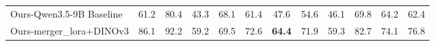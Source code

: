 \begin{table}[t]
{\begin{tabular}{lccccccccccc}
	    Ours-Qwen3.5-9B Baseline         & 61.2          & 80.4          & 43.3          & 68.1          & 61.4          & 47.6          & 54.6          & 46.1          & 69.8          & 64.2          & 62.4         \\
	    Ours-merger\_lora+DINOv3          & 86.1          & 92.2          & 59.2          & 69.5          & 72.6          & \textbf{64.4} & 71.9          & 59.3          & 82.7          & 74.1          & 76.8         \\
    \bottomrule
  \end{tabular}%
  }
\end{table}
